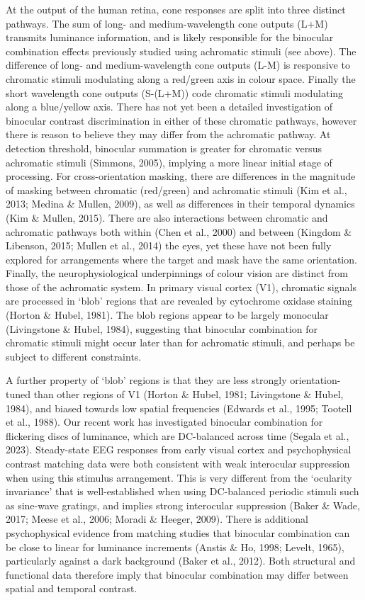 \documentclass[
]{article}
\begin{document}
At the output of the human retina, cone responses are split into three distinct pathways. The sum of long- and medium-wavelength cone outputs (L+M) transmits luminance information, and is likely responsible for the binocular combination effects previously studied using achromatic stimuli (see above). The difference of long- and medium-wavelength cone outputs (L-M) is responsive to chromatic stimuli modulating along a red/green axis in colour space. Finally the short wavelength cone outputs (S-(L+M)) code chromatic stimuli modulating along a blue/yellow axis. There has not yet been a detailed investigation of binocular contrast discrimination in either of these chromatic pathways, however there is reason to believe they may differ from the achromatic pathway. At detection threshold, binocular summation is greater for chromatic versus achromatic stimuli (Simmons, 2005), implying a more linear initial stage of processing. For cross-orientation masking, there are differences in the magnitude of masking between chromatic (red/green) and achromatic stimuli (Kim et al., 2013; Medina \& Mullen, 2009), as well as differences in their temporal dynamics (Kim \& Mullen, 2015). There are also interactions between chromatic and achromatic pathways both within (Chen et al., 2000) and between (Kingdom \& Libenson, 2015; Mullen et al., 2014) the eyes, yet these have not been fully explored for arrangements where the target and mask have the same orientation. Finally, the neurophysiological underpinnings of colour vision are distinct from those of the achromatic system. In primary visual cortex (V1), chromatic signals are processed in `blob' regions that are revealed by cytochrome oxidase staining (Horton \& Hubel, 1981). The blob regions appear to be largely monocular (Livingstone \& Hubel, 1984), suggesting that binocular combination for chromatic stimuli might occur later than for achromatic stimuli, and perhaps be subject to different constraints.

A further property of `blob' regions is that they are less strongly orientation-tuned than other regions of V1 (Horton \& Hubel, 1981; Livingstone \& Hubel, 1984), and biased towards low spatial frequencies (Edwards et al., 1995; Tootell et al., 1988). Our recent work has investigated binocular combination for flickering discs of luminance, which are DC-balanced across time (Segala et al., 2023). Steady-state EEG responses from early visual cortex and psychophysical contrast matching data were both consistent with weak interocular suppression when using this stimulus arrangement. This is very different from the `ocularity invariance' that is well-established when using DC-balanced periodic stimuli such as sine-wave gratings, and implies strong interocular suppression (Baker \& Wade, 2017; Meese et al., 2006; Moradi \& Heeger, 2009). There is additional psychophysical evidence from matching studies that binocular combination can be close to linear for luminance increments (Anstis \& Ho, 1998; Levelt, 1965), particularly against a dark background (Baker et al., 2012). Both structural and functional data therefore imply that binocular combination may differ between spatial and temporal contrast.
\end{document}
